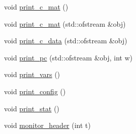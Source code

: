 \begin{DoxyCompactItemize}
$$void \mbox{\hyperlink{classpacking_ad65b44ad181d5311b6f4b2177b118f82}{print\+\_\+c\+\_\+mat}} ()
\item 
void \mbox{\hyperlink{classpacking_ab6181af7330866576f5f6e5ad42446a3}{print\+\_\+c\+\_\+mat}} (std\+::ofstream \&obj)
\item 
void \mbox{\hyperlink{classpacking_a4d5591724c0cd87df921dcae97d24305}{print\+\_\+c\+\_\+data}} (std\+::ofstream \&obj)
\item 
void \mbox{\hyperlink{classpacking_ac48b7b4764be70a7c3c9728687593f0e}{print\+\_\+pc}} (std\+::ofstream \&obj, int w)
\item 
void \mbox{\hyperlink{classpacking_a153155d72d5c0ba11f22939ec59c7c87}{print\+\_\+vars}} ()
\item 
void \mbox{\hyperlink{classpacking_aafb35d8f7a0901ecaad05d3ea0e8ccf8}{print\+\_\+config}} ()
\item 
void \mbox{\hyperlink{classpacking_a82af7804db28ae21d1b049190a4cc7d9}{print\+\_\+stat}} ()
\item 
void \mbox{\hyperlink{classpacking_a5567ef97dc24a25a5466dcbd8af82737}{monitor\+\_\+header}} (int t)
\end{DoxyCompactItemize}
